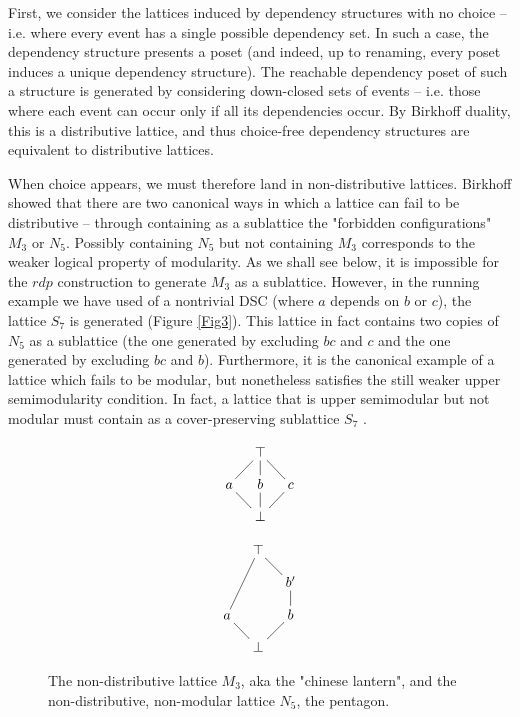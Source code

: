 \documentclass[hoptionsi,review,format=acmsmall]{acmart}
\theoremstyle{definition}
\begin{document}
First, we consider the lattices induced by dependency structures with no choice -- i.e. where every event has a single possible dependency set. In such a case, the dependency structure presents a poset (and indeed, up to renaming, every poset induces a unique dependency structure). The reachable dependency poset of such a structure is generated by considering down-closed sets of events -- i.e. those where each event can occur only if all its dependencies occur. By Birkhoff duality, this is a distributive lattice, and thus choice-free dependency structures are equivalent to distributive lattices.

When choice appears, we must therefore land in non-distributive lattices. Birkhoff showed that there are two canonical ways in which a lattice can fail to be distributive -- through containing as a sublattice the "forbidden configurations" \(M_3\) or \(N_5\). Possibly containing \(N_5\) but not containing \(M_3\) corresponds to the weaker logical property of modularity. As we shall see below, it is impossible for the \(rdp\) construction to generate \(M_3\) as a sublattice. However, in the running example we have used of a nontrivial DSC (where \(a\) depends on \(b\) or \(c\)), the lattice \(S_7\) is generated (Figure \ref{Fig3}). This lattice in fact contains two copies of \(N_5\) as a sublattice (the one generated by excluding \(bc\) and \(c\) and the one generated by excluding \(bc\) and \(b\)). Furthermore, it is the canonical example of a lattice which fails to be modular, but nonetheless satisfies the still weaker upper semimodularity condition. In fact, a lattice that is upper semimodular but not modular must contain as a cover-preserving sublattice \(S_7\)  \cite{stern1999semimodular}. 

\begin{figure}
\begin{minipage}[c]{0.3\textwidth}
\begin{equation*}
    \xymatrix@=1em{& \top \ar@{-}[dl] \ar@{-}[d] \ar@{-}[dr] & \\
      a \ar@{-}[dr] & b \ar@{-}[d] & c \ar@{-}[dl]  \\
       & \bot &}
\end{equation*}
\end{minipage}
\begin{minipage}[c]{0.3\textwidth}
\begin{equation*}
    \xymatrix@=1em{& \top \ar@{-}[ddl] \ar@{-}[dr] & \\
      & & b'  \ar@{-}[d]  \\
      a \ar@{-}[dr] & & b \ar@{-}[dl] \\
      & \bot &}
\end{equation*}
\end{minipage}

\caption{The non-distributive lattice \(M_3\), aka the "chinese lantern", and the non-distributive, non-modular lattice \(N_5\), the pentagon.}
\label{Fig2}
\end{figure}
\end{document}
